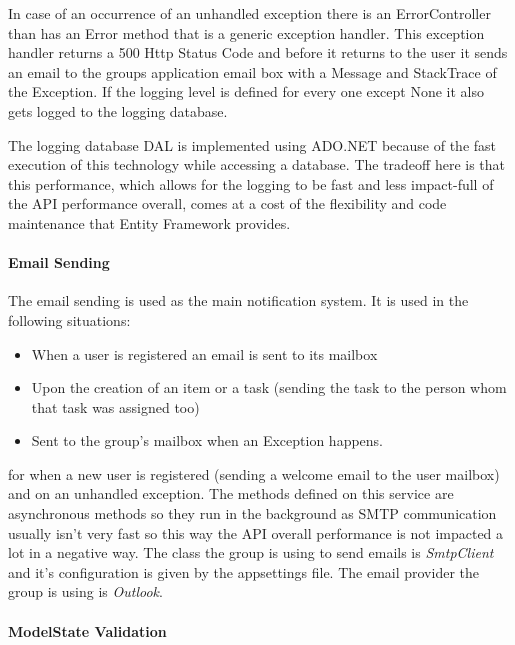 In case of an occurrence of an unhandled exception there is an ErrorController than has an Error method that is a generic exception handler. This exception handler returns a 500 Http Status Code and before it returns to the user it sends an email to the groups application email box with a Message and StackTrace of the Exception. If the logging level is defined for every one except None it also gets logged to the logging database.

The logging database DAL is implemented using ADO.NET because of the fast execution of this technology while accessing a database. The tradeoff here is that this performance, which allows for the logging to be fast and less impact-full of the API performance overall, comes at a cost of the flexibility and code maintenance that Entity Framework provides.

\paragraph{Email Sending}

The email sending is used as the main notification system. It is used in the following situations:
\begin{itemize}
	\item When a user is registered an email is sent to its mailbox
	\item Upon the creation of an item or a task (sending the task to the person whom that task was assigned too)
	\item Sent to the group's mailbox when an Exception happens.
\end{itemize}

for when a new user is registered (sending a welcome email to the user mailbox) and on an unhandled exception.
The methods defined on this service are asynchronous methods so they run in the background as SMTP communication usually isn't very fast so this way the API overall performance is not impacted a lot in a negative way. The class the group is using to send emails is \textit{SmtpClient} and it's configuration is given by the appsettings file. The email provider the group is using is \textit{Outlook}.


\paragraph{ModelState Validation}

